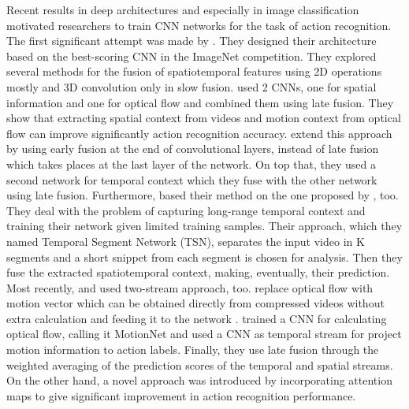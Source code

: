 Recent results in deep architectures and especially in image classification motivated researchers to train CNN networks for
the task of action recognition. The first significant attempt was made by \cite{6909619}. They designed their architecture based on the best-scoring CNN
in the ImageNet competition. They explored several methods for the  fusion of spatiotemporal features using 2D operations mostly and 3D convolution only in slow fusion.
\cite{simonyan2014two}  used 2 CNNs, one for spatial information and one for optical flow and combined them using late fusion.
They show that extracting spatial context from videos and motion context from optical flow can improve significantly action recognition accuracy.
\cite{DBLP:journals/corr/FeichtenhoferPZ16} extend this approach by using early fusion at the end of convolutional layers,  instead of late fusion which
takes places at the last layer of the network. On top that, they used a second network for temporal context which they fuse with the other network using late
fusion. Furthermore, \cite{DBLP:journals/corr/WangXW0LTG16} based their method on the one proposed by \cite{simonyan2014two}, too. They deal with the problem of capturing long-range
temporal context and training their network given limited training samples. Their approach, which they named Temporal Segment Network (TSN), separates the input
video in K segments and a short snippet from each segment is chosen for analysis. Then they fuse  the extracted spatiotemporal context, making, eventually, their
prediction.
Most recently, \cite{DBLP:journals/corr/ZhangWWQW16} and \cite{DBLP:journals/corr/ZhuLNH17a} used two-stream approach, too. \cite{DBLP:journals/corr/ZhangWWQW16} replace optical flow with motion vector which can be obtained directly from compressed videos without extra calculation and feeding it to the  network . \cite{DBLP:journals/corr/ZhuLNH17a} trained a CNN for calculating optical flow, calling it
MotionNet and used a  CNN as temporal stream for project motion information to action labels. Finally, they use late fusion through the weighted averaging of the prediction scores of the temporal and spatial streams. On the other hand, a novel approach was introduced by \cite{DBLP:journals/corr/abs-1711-01467} incorporating attention maps to give significant improvement in action recognition performance. \par 

